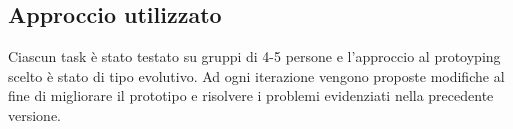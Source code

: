 \subsection{Approccio utilizzato}

Ciascun task è stato testato su gruppi di 4-5 persone e l'approccio al protoyping scelto è stato di tipo evolutivo. Ad ogni iterazione vengono proposte modifiche al fine di migliorare il prototipo e risolvere i problemi evidenziati nella precedente versione.

\clearpage

%
%
%
%
%
%
%
%

